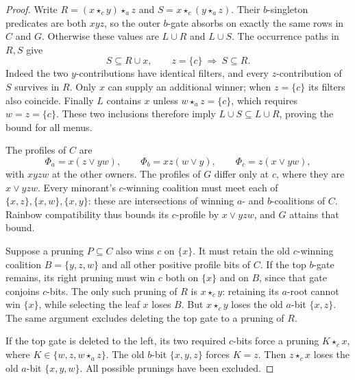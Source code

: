 \begin{proof}
Write $R=(x\star_c y)\star_a z$ and $S=x\star_c(y\star_a z)$.
Their $b$-singleton predicates are both $xyz$, so the outer $b$-gate
absorbs on exactly the same rows in $C$ and $G$.
Otherwise these values are $L\cup R$ and $L\cup S$.
The occurrence paths in $R,S$ give
\[
 S\subseteq R\cup x,\qquad z=\{c\}\ \Longrightarrow\ S\subseteq R.
\]
Indeed the two $y$-contributions have identical filters, and every
$z$-contribution of $S$ survives in $R$. Only $x$ can supply an
additional winner; when $z=\{c\}$ its filters also coincide.
Finally $L$ contains $x$ unless $w\star_a z=\{c\}$, which requires
$w=z=\{c\}$. These two inclusions therefore imply
$L\cup S\subseteq L\cup R$, proving the bound for all menus.

The profiles of $C$ are
\[
 \Phi_a=x(z\lor yw),\qquad
 \Phi_b=xz(w\lor y),\qquad
 \Phi_c=z(x\lor yw),
\]
with $xyzw$ at the other owners. The profiles of $G$ differ only at
$c$, where they are $x\lor yzw$.
Every minorant's $c$-winning coalition must meet each of
$\{x,z\},\{x,w\},\{x,y\}$: these are intersections of winning
$a$- and $b$-coalitions of $C$. Rainbow compatibility thus bounds
its $c$-profile by $x\lor yzw$, and $G$ attains that bound.

Suppose a pruning $P\subseteq C$ also wins $c$ on $\{x\}$.
It must retain the old $c$-winning coalition $B=\{y,z,w\}$ and
all other positive profile bits of $C$.
If the top $b$-gate remains, its right pruning must win $c$ both
on $\{x\}$ and on $B$, since that gate conjoins $c$-bits.
The only such pruning of $R$ is $x\star_c y$: retaining its
$a$-root cannot win $\{x\}$, while selecting the leaf $x$ loses
$B$. But $x\star_c y$ loses the old $a$-bit $\{x,z\}$.
The same argument excludes deleting the top gate to a pruning of $R$.

If the top gate is deleted to the left, its two required $c$-bits
force a pruning $K\star_c x$, where
$K\in\{w,z,w\star_a z\}$.
The old $b$-bit $\{x,y,z\}$ forces $K=z$.
Then $z\star_c x$ loses the old $a$-bit $\{x,y,w\}$.
All possible prunings have been excluded.
\end{proof}
